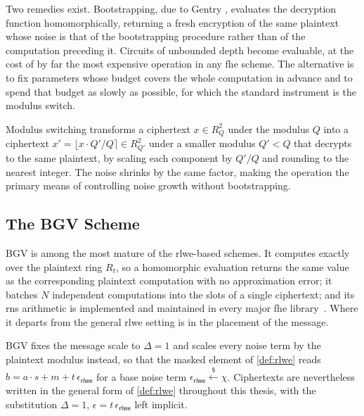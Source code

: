 Two remedies exist. Bootstrapping, due to Gentry \cite{gentry:2009}, evaluates the decryption function homomorphically, returning a fresh encryption of the same plaintext whose noise is that of the bootstrapping procedure rather than of the computation preceding it. Circuits of unbounded depth become evaluable, at the cost of by far the most expensive operation in any \gls{fhe} scheme. The alternative is to fix parameters whose budget covers the whole computation in advance and to spend that budget as slowly as possible, for which the standard instrument is the modulus switch.

\begin{definition}
    \label{def:modswitch}
    Modulus switching transforms a ciphertext $x \in R_Q^2$ under the modulus $Q$ into a ciphertext $x' = \lfloor x \cdot Q'/Q \rceil \in R_{Q'}^2$ under a smaller modulus $Q' < Q$ that decrypts to the same plaintext, by scaling each component by $Q'/Q$ and rounding to the nearest integer. The noise shrinks by the same factor, making the operation the primary means of controlling noise growth without bootstrapping.
\end{definition}

\subsection{The BGV Scheme}
\label{sec:bgv}
BGV \cite{cryptoeprint:2011/277} is among the most mature of the \gls{rlwe}-based schemes. It computes exactly over the plaintext ring $R_t$, so a homomorphic evaluation returns the same value as the corresponding plaintext computation with no approximation error; it batches $N$ independent computations into the slots of a single ciphertext; and its \gls{rns} arithmetic is implemented and maintained in every major \gls{fhe} library~\cite{cryptoeprint:2021/204, cryptoeprint:2022/915}. Where it departs from the general \gls{rlwe} setting is in the placement of the message.

BGV fixes the message scale to $\Delta = 1$ and scales every noise term by the plaintext modulus instead, so that the masked element of \autoref{def:rlwe} reads $b = a \cdot s + m + t\,\epsilon_{\mathsf{rlwe}}$ for a base noise term $\epsilon_{\mathsf{rlwe}} \overset{\$}{\leftarrow} \chi$.
Ciphertexts are nevertheless written in the general form of \autoref{def:rlwe} throughout this thesis, with the substitution $\Delta = 1$, $\epsilon = t\,\epsilon_{\mathsf{rlwe}}$ left implicit.

